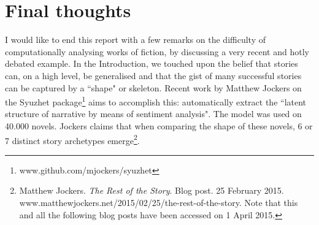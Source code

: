 \documentclass[bsc,frontabs,deptreport,singlespacing,parskip, twoside]{infthesis}
\begin{document}
\section{Final thoughts}
I would like to end this report with a few remarks on the difficulty of computationally analysing works of fiction, by discussing a very recent and hotly debated example. In the Introduction, we touched upon the belief that stories can, on a high level, be generalised and that the gist of many successful stories can be captured by a ``shape" or skeleton. Recent work by Matthew Jockers on the Syuzhet package\footnote{www.github.com/mjockers/syuzhet} aims to accomplish this: automatically extract the ``latent structure of narrative by means of sentiment analysis". The model was used on 40.000 novels. Jockers claims that when comparing the shape of these novels, 6 or 7 distinct story archetypes emerge\footnote{Matthew Jockers. \textit{The Rest of the Story}. Blog post. 25 February 2015. www.matthewjockers.net/2015/02/25/the-rest-of-the-story. Note that this and all the following blog posts have been accessed on 1 April 2015.}. 
\end{document}
